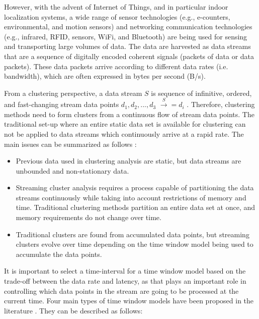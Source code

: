 However, with the advent of Internet of Things, and in particular indoor localization systems, a wide range of sensor technologies (e.g., e-counters, environmental, and motion sensors) and networking communication technologies (e.g., infrared, RFID, sensors, WiFi, and Bluetooth) are being used for sensing and transporting large volumes of data. The data are harvested as data streams that are a sequence of digitally encoded coherent signals (packets of data or data packets). These data packets arrive according to different data rates (i.e. bandwidth), which are often expressed in bytes per second (B/s).

From a clustering perspective, a data stream $S$ is sequence of infinitive, ordered, and fast-changing stream data points $d_1, d_2, ..., d_3 $ $\xrightarrow S = {d_i}$ \cite{han2011data}. Therefore, clustering methods need to form clusters from a continuous flow of stream data points. The traditional set-up where an entire static data set is available for clustering can not be applied to data streams which continuously arrive at a rapid rate. The main issues can be summarized as follows \cite{toshniwal2013clustering}:

\begin{itemize}
    \item Previous data used in clustering analysis are static, but data streams are unbounded and non-stationary data.
    \item Streaming cluster analysis requires a process capable of partitioning the data streams continuously while taking into account restrictions of memory and time. Traditional clustering methods partition an entire data set at once, and memory requirements do not change over time. 
    \item Traditional clusters are found from accumulated data points, but streaming clusters evolve over time depending on the time window model being used to accumulate the data points.
\end{itemize}

It is important to select a time-interval for a time window model based on the trade-off between the data rate and latency, as that plays an important role in controlling which data points in the stream are going to be processed at the current time. Four main types of time window models have been proposed in the literature \cite{nguyen2015survey, mansalis2018evaluation}. They can be described as follows:

